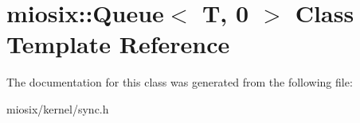 \hypertarget{classmiosix_1_1_queue_3_01_t_00_010_01_4}{\section{miosix\-:\-:Queue$<$ T, 0 $>$ Class Template Reference}
\label{classmiosix_1_1_queue_3_01_t_00_010_01_4}
}


The documentation for this class was generated from the following file\-:\begin{DoxyCompactItemize}
\item 
miosix/kernel/sync.\-h\end{DoxyCompactItemize}
